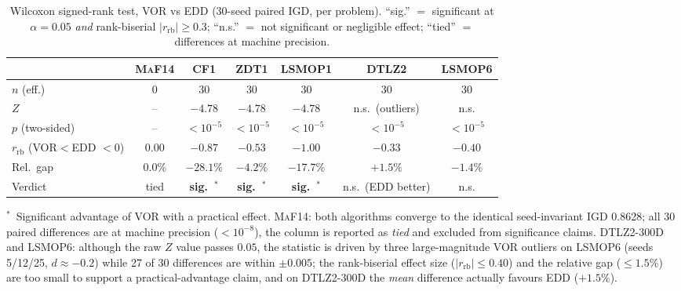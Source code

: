 \documentclass[preprint,12pt]{elsarticle}
\begin{document}
\begin{table}[t]
\centering
\caption{Wilcoxon signed-rank test, \textsc{VOR} vs \textsc{EDD} (30-seed
paired IGD, per problem). ``sig.'' $=$ significant at $\alpha=0.05$
\emph{and} rank-biserial $|r_{\mathrm{rb}}|\ge 0.3$; ``n.s.'' $=$ not
significant or negligible effect; ``tied'' $=$ differences at machine
precision.}
\label{tab:wilcoxon}
\footnotesize
\setlength{\tabcolsep}{2.5pt}
\begin{tabular}{@{}lcccccc@{}}
\toprule
 & \textsc{MaF14} & \textsc{CF1} & \textsc{ZDT1}
 & \textsc{LSMOP1} & \textsc{DTLZ2} & \textsc{LSMOP6}\\
\midrule
$n$ (eff.) & 0 & 30 & 30 & 30 & 30 & 30\\
$Z$ & -- & $-4.78$ & $-4.78$
  & $-4.78$ & n.s.\ (outliers) & n.s.\\
$p$ (two-sided) & -- & $<10^{-5}$ & $<10^{-5}$
  & $<10^{-5}$ & $<10^{-5}$ & $<10^{-5}$\\
$r_{\mathrm{rb}}$ (VOR$<$EDD $<$0) & 0.00 & $-0.87$ & $-0.53$
  & $-1.00$ & $-0.33$ & $-0.40$\\
Rel.\ gap & 0.0\% & $-28.1\%$ & $-4.2\%$
  & $-17.7\%$ & $+1.5\%$ & $-1.4\%$\\
Verdict & tied & \textbf{sig.\ $^{*}$} & \textbf{sig.\ $^{*}$}
  & \textbf{sig.\ $^{*}$} & n.s.\ (EDD better) & n.s.\\
\bottomrule
\end{tabular}

\medskip
{\footnotesize $^{*}$\ Significant advantage of \textsc{VOR} with a
practical effect. \textsc{MaF14}: both algorithms converge to the
identical seed-invariant IGD 0.8628; all 30 paired differences are at
machine precision ($<10^{-8}$), the column is reported as \emph{tied}
and excluded from significance claims. \textsc{DTLZ2}-300D and
\textsc{LSMOP6}: although the raw $Z$ value passes $0.05$, the
statistic is driven by three large-magnitude \textsc{VOR} outliers on
\textsc{LSMOP6} (seeds 5/12/25, $d\approx -0.2$) while 27 of 30
differences are within $\pm 0.005$; the rank-biserial effect size
($|r_{\mathrm{rb}}|\le 0.40$) and the relative gap ($\le 1.5\%$) are
too small to support a practical-advantage claim, and on
\textsc{DTLZ2}-300D the \emph{mean} difference actually favours
\textsc{EDD} ($+1.5\%$).}
\end{table}
\end{document}
